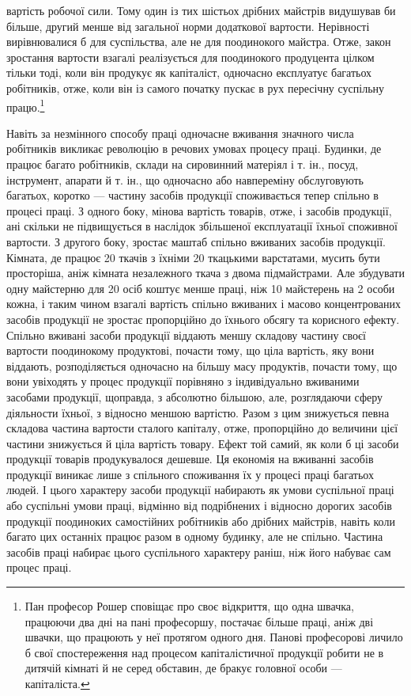 вартість робочої сили. Тому один із тих шістьох дрібних майстрів
видушував би більше, другий менше від загальної норми додаткової
вартости. Нерівності вирівнювалися б для суспільства, але
не для поодинокого майстра. Отже, закон зростання вартости
взагалі реалізується для поодинокого продуцента цілком тільки
тоді, коли він продукує як капіталіст, одночасно експлуатує
багатьох робітників, отже, коли він із самого початку пускає в
рух пересічну суспільну працю.\footnote{
Пан професор Рошер сповіщає про своє відкриття, що одна швачка,
працюючи два дні на пані професоршу, постачає більше праці, аніж дві
швачки, що працюють у неї протягом одного дня. Панові професорові
личило б свої спостереження над процесом капіталістичної продукції
робити не в дитячій кімнаті й не серед обставин, де бракує головної особи —
капіталіста.
}

Навіть за незмінного способу праці одночасне вживання
значного числа робітників викликає революцію в речових умовах
процесу праці. Будинки, де працює багато робітників, склади
на сировинний матеріял і т. ін., посуд, інструмент, апарати й т. ін.,
що одночасно або навпереміну обслуговують багатьох, коротко —
частину засобів продукції споживається тепер спільно в процесі
праці. З одного боку, мінова вартість товарів, отже, і засобів
продукції, ані скільки не підвищується в наслідок збільшеної
експлуатації їхньої споживної вартости. З другого боку,
зростає маштаб спільно вживаних засобів продукції. Кімната,
де працює 20 ткачів з їхніми 20 ткацькими варстатами, мусить
бути просторіша, аніж кімната незалежного ткача з двома підмайстрами.
Але збудувати одну майстерню для 20 осіб коштує
менше праці, ніж 10 майстерень на 2 особи кожна, і таким чином
взагалі вартість спільно вживаних і масово концентрованих засобів
продукції не зростає пропорційно до їхнього обсягу та корисного
ефекту. Спільно вживані засоби продукції віддають меншу
складову частину своєї вартости поодинокому продуктові, почасти
тому, що ціла вартість, яку вони віддають, розподіляється
одночасно на більшу масу продуктів, почасти тому, що вони увіходять
у процес продукції порівняно з індивідуально вживаними
засобами продукції, щоправда, з абсолютно більшою, але, розглядаючи
сферу діяльности їхньої, з відносно меншою вартістю.
Разом з цим знижується певна складова частина вартости сталого
капіталу, отже, пропорційно до величини цієї частини знижується
й ціла вартість товару. Ефект той самий, як коли б ці засоби
продукції товарів продукувалося дешевше. Ця економія на вживанні
засобів продукції виникає лише з спільного споживання
їх у процесі праці багатьох людей. І цього характеру засоби продукції
набирають як умови суспільної праці або суспільні умови
праці, відмінно від подрібнених і відносно дорогих засобів продукції
поодиноких самостійних робітників або дрібних майстрів,
навіть коли багато цих останніх працює разом в одному будинку,
але не спільно. Частина засобів праці набирає цього суспільного
характеру раніш, ніж його набуває сам процес праці.